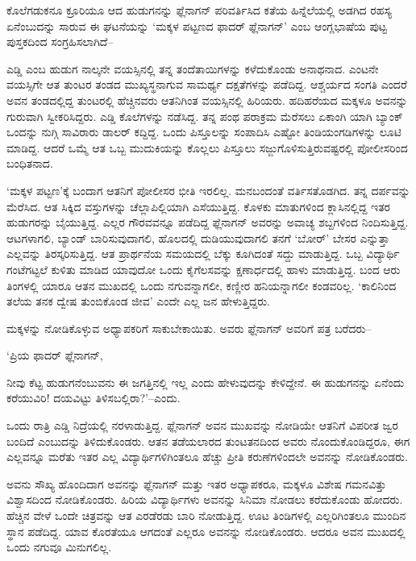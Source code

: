 ಕೊಲೆಗಡುಕನೂ ಕ್ರೂರಿಯೂ ಆದ ಹುಡುಗನನ್ನು ಫ್ಲೆನಾಗನ್ ಪರಿವರ್ತಿಸಿದ ಕತೆಯ ಹಿನ್ನೆಲೆಯಲ್ಲಿ ಅಡಗಿದ ರಹಸ್ಯ ಏನೆಂಬುದನ್ನು ಸಾರುವ ಈ ಘಟನೆಯನ್ನು ‘ಮಕ್ಕಳ ಪಟ್ಟಣದ ಫಾದರ್ ಫ್ಲೆನಾಗನ್​’ ಎಂಬ ಆಂಗ್ಲಭಾಷೆಯ ಪುಟ್ಟ ಪುಸ್ತಕದಿಂದ ಸಂಗ್ರಹಿಸಲಾಗಿದೆ–

ಎಡ್ಡಿ ಎಂಬ ಹುಡುಗ ನಾಲ್ಕನೇ ವಯಸ್ಸಿನಲ್ಲಿ ತನ್ನ ತಂದೆತಾಯಿಗಳನ್ನು ಕಳೆದುಕೊಂಡು ಅನಾಥನಾದ. ಎಂಟನೇ ವಯಸ್ಸಿಗೇ ಆತ ತುಂಟರ ತಂಡದ ಮುಖ್ಯಸ್ಥನಾಗುವ ಸಾಮರ್ಥ್ಯ ದಕ್ಷತೆಗಳನ್ನು ಪಡೆದಿದ್ದ. ಆಶ್ಚರ್ಯದ ಸಂಗತಿ ಎಂದರೆ ಅವನ ತಂಡದಲ್ಲಿದ್ದ ತುಂಟರಲ್ಲಿ ಹೆಚ್ಚಿ\-ನವರು ಆತನಿಗಿಂತ ವಯಸ್ಸಿನಲ್ಲಿ ಹಿರಿಯರು. ಹದಿಹರೆಯದ ಮಕ್ಕಳೂ ಅವನನ್ನು ಗುರುವಾಗಿ ಸ್ವೀಕರಿಸಿದ್ದರು. ಎಡ್ಡಿ ಕೊಲೆಗಳನ್ನು ನಡೆಸಿದ್ದ. ತನ್ನ ಪಂಥ ಪರಾಕ್ರಮ ಮೆರೆಸಲು ಏಕಾಂಗಿ ಯಾಗಿ ಬ್ಯಾಂಕ್ ಒಂದನ್ನು ನುಗ್ಗಿ ಸಾವಿರಾರು ಡಾಲರ್ ಕದ್ದಿದ್ದ. ಒಂದು ಪಿಸ್ತೂಲನ್ನು ಸಂಪಾದಿಸಿ ಎಷ್ಟೋ ತಿಂಡಿಯಂಗಡಿಗಳನ್ನು ಲೂಟಿ ಮಾಡಿದ್ದ. ಆದರೆ ಒಮ್ಮೆ ಆತ ಒಬ್ಬ ಮುದುಕಿಯನ್ನು ಕೊಲ್ಲಲು ಪಿಸ್ತೂಲು ಸಜ್ಜುಗೊಳಿಸುತ್ತಿರುವಷ್ಟರಲ್ಲಿ ಪೋಲೀಸರಿಂದ ಬಂಧಿತನಾದ.

‘ಮಕ್ಕಳ ಪಟ್ಟಣ’ಕ್ಕೆ ಬಂದಾಗ ಆತನಿಗೆ ಪೋಲೀಸರ ಭೀತಿ ಇರಲಿಲ್ಲ. ಮನಬಂದಂತೆ ವರ್ತಿಸತೊಡಗಿದ. ತನ್ನ ದರ್ಪವನ್ನು ಮೆರೆಸಿದ. ಆತ ಸಿಕ್ಕಿದ ವಸ್ತುಗಳನ್ನು ಚೆಲ್ಲಾಪಿಲ್ಲಿಯಾಗಿ ಎಸೆಯುತ್ತಿದ್ದ. ಕೊಳಕು ಮಾತುಗಳಿಂದ ಕ್ಲಾಸಿನಲ್ಲಿದ್ದ ಇತರ ಹುಡುಗರನ್ನು ಬೈಯುತ್ತಿದ್ದ. ಎಲ್ಲರ ಗೌರವವನ್ನೂ ಪಡೆದಿದ್ದ ಫ್ಲೆನಾಗನ್ ಅವರನ್ನು ಅವಾಚ್ಯ ಶಬ್ದಗಳಿಂದ ನಿಂದಿಸುತ್ತಿದ್ದ. ಆಟಗಳಾಗಲಿ, ಬ್ಯಾಂಡ್ ಬಾರಿಸುವುದಾಗಲಿ, ಹೊಲದಲ್ಲಿ ದುಡಿಯುವುದಾಗಲಿ ತನಗೆ ‘ಬೋರ್​’ ಬೇಸರ ಎನ್ನುತ್ತಾ ಎಲ್ಲವನ್ನು ತಿರಸ್ಕರಿಸುತ್ತಿದ್ದ. ಆತ ಪ್ರಾರ್ಥನೆಯ ಸಮಯದಲ್ಲಿ ಬೆಕ್ಕು ಕೂಗಿದಂತೆ ಸದ್ದು ಮಾಡುತ್ತಿದ್ದ. ಒಬ್ಬ ವಿದ್ಯಾರ್ಥಿ ಗಂಟೆಗಟ್ಟಲೆ ಕುಳಿತು ಮಾಡಿದ ಯಾವುದೋ ಒಂದು ಕೈಗೆಲಸವನ್ನು ಕ್ಷಣಾರ್ಧದಲ್ಲಿ ಹಾಳು ಮಾಡುತ್ತಿದ್ದ. ಬಂದ ಆರು ತಿಂಗಳಲ್ಲಿ ಯಾರೂ ಆತನ ಮುಖದಲ್ಲಿ ಒಂದು ನಗುವನ್ನಾಗಲೀ, ಕಣ್ಣೀರ ಹನಿಯನ್ನಾಗಲೀ ಕಂಡವರಿಲ್ಲ. ‘ಕಾಲಿನಿಂದ ತಲೆಯ ತನಕ ದ್ವೇಷ ತುಂಬಿಕೊಂಡ ಜೀವ’ ಎಂದೇ ಎಲ್ಲ ಜನ ಹೇಳುತ್ತಿದ್ದರು.

ಮಕ್ಕಳನ್ನು ನೋಡಿಕೊಳ್ಳುವ ಅಧ್ಯಾಪಕರಿಗೆ ಸಾಕುಬೇಕಾಯಿತು. ಅವರು ಫ್ಲೆನಾಗನ್ ಅವರಿಗೆ ಪತ್ರ ಬರೆದರು–

‘ಪ್ರಿಯ ಫಾದರ್ ಫ್ಲೆನಾಗನ್,

\newpage

ನೀವು ಕೆಟ್ಟ ಹುಡುಗನೆಂಬುವನು ಈ ಜಗತ್ತಿನಲ್ಲಿ ಇಲ್ಲ ಎಂದು ಹೇಳುವುದನ್ನು ಕೇಳಿದ್ದೇನೆ. ಈ ಹುಡುಗನನ್ನು ಏನೆಂದು ಕರೆಯುವಿರಿ! ದಯವಿಟ್ಟು ತಿಳಿಸಬಲ್ಲಿರಾ?’–ಎಂದು.

ಒಂದು ರಾತ್ರಿ ಎಡ್ಡಿ ನಿದ್ರೆಯಲ್ಲಿ ನರಳಾಡುತ್ತಿದ್ದ. ಫ್ಲೆನಾಗನ್ ಅವನ ಮುಖವನ್ನು ನೋಡಿಯೇ ಆತನಿಗೆ ವಿಪರೀತ ಜ್ವರ ಬಂದಿದೆ ಎಂಬುದನ್ನು ತಿಳಿದುಕೊಂಡರು. ಆತನ ತಡೆಯಲಾರದ ತುಂಟತನದಿಂದ ಅವರು ನೊಂದುಕೊಂಡಿದ್ದರೂ, ಈಗ ಎಲ್ಲವನ್ನೂ ಮರೆತು ಇತರ ಎಲ್ಲ ವಿದ್ಯಾರ್ಥಿ\-ಗಳಿಗಿಂತಲೂ ಹೆಚ್ಚು ಪ್ರೀತಿ ಕರುಣೆಗಳಿಂದಲೇ ಅವನನ್ನು ನೋಡಿಕೊಂಡರು.

ಅವನು ಸೌಖ್ಯ ಹೊಂದಿದಾಗ ಅವನನ್ನು ಫ್ಲೆನಾಗನ್ ಮತ್ತು ಇತರ ಅಧ್ಯಾಪಕರೂ, ಮಕ್ಕಳೂ ವಿಶೇಷ ಗಮನವಿತ್ತು ವಿಶ್ವಾಸದಿಂದ ನೋಡಿಕೊಂಡರು. ಹಿರಿಯ ವಿದ್ಯಾರ್ಥಿಗಳು ಅವನನ್ನು ಸಿನಿಮಾ ನೋಡಲು ಕರೆದುಕೊಂಡು ಹೋದರು. ಹೆಚ್ಚಿನ ವೇಳೆ ಒಂದೇ ಚಿತ್ರವನ್ನು ಆತ ಎರಡೆರಡು ಬಾರಿ ನೋಡುತ್ತಿದ್ದ. ಊಟ ತಿಂಡಿಗಳಲ್ಲಿ ಎಲ್ಲರಿಗಿಂತಲೂ ಮುಂದಿನ ಸ್ಥಾನ ಪಡೆದಿದ್ದ. ಯಾವ ಕೊರತೆಯೂ ಆಗದಂತೆ ಎಲ್ಲರೂ ಅವನನ್ನು ನೋಡಿಕೊಂಡರು. ಆದರೂ ಅವನ ಮುಖದಲ್ಲಿ ಒಂದು ನಗುವೂ ಮಿನುಗಲಿಲ್ಲ.

